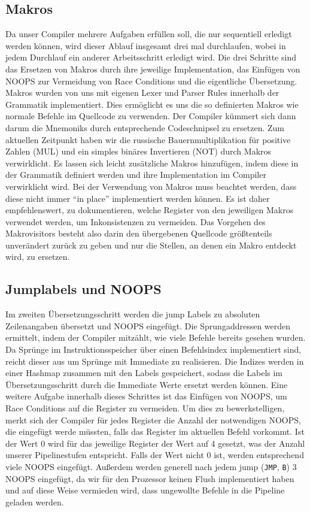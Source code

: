 \documentclass[paper=a4,fontsize=12pt]{scrreprt}
\begin{document}
\subsection{Makros}
Da unser Compiler mehrere Aufgaben erfüllen soll, die nur sequentiell erledigt werden können, wird dieser Ablauf insgesamt drei mal durchlaufen, wobei in jedem Durchlauf ein anderer Arbeitsschritt erledigt wird. Die drei Schritte sind das Ersetzen von Makros durch ihre jeweilige Implementation, das Einfügen von NOOPS zur Vermeidung von Race Conditions und die eigentliche Übersetzung.
Makros wurden von uns mit eigenen Lexer und Parser Rules innerhalb der Grammatik implementiert. Dies ermöglicht es uns die so definierten Makros wie normale Befehle im Quellcode zu verwenden. Der Compiler kümmert sich dann darum die Mnemoniks durch entsprechende Codeschnipsel zu ersetzen. Zum aktuellen Zeitpunkt haben wir die russische Bauernmultiplikation für positive Zahlen (MUL) und ein simples binäres Invertieren (NOT) durch Makros verwirklicht. Es lassen sich leicht zusätzliche Makros hinzufügen, indem diese in der Grammatik definiert werden und ihre Implementation im Compiler verwirklicht wird. Bei der Verwendung von Makros muss beachtet werden, dass diese nicht immer \enquote{in place} implementiert werden können. Es ist daher empfehlenswert, zu dokumentieren, welche Register von den jeweiligen Makros verwendet werden, um Inkonsistenzen zu vermeiden.
Das Vorgehen des Makrovisitors besteht also darin den übergebenen Quellcode größtenteils unverändert zurück zu geben und nur die Stellen, an denen ein Makro entdeckt wird, zu ersetzen.

\subsection{Jumplabels und NOOPS}
Im zweiten Übersetzungsschritt werden die jump Labels zu absoluten Zeilenangaben übersetzt und NOOPS eingefügt. Die Sprungaddressen werden ermittelt, indem der Compiler mitzählt, wie viele Befehle bereits gesehen wurden. Da Sprünge im Instruktionsspeicher über einen Befehlsindex implementiert sind, reicht dieser aus um Sprünge mit Immediate zu realisieren. Die Indizes werden in einer Hashmap zusammen mit den Labels gespeichert, sodass die Labels im Übersetzungsschritt durch die Immediate Werte ersetzt werden können.
Eine weitere Aufgabe innerhalb dieses Schrittes ist das Einfügen von NOOPS, um Race Conditions auf die Register zu vermeiden. Um dies zu bewerkstelligen, merkt sich der Compiler für jedes Register die Anzahl der notwendigen NOOPS, die eingefügt werde müssten, falls das Register im aktuellen Befehl vorkommt. Ist der Wert 0 wird für das jeweilige Register der Wert auf 4 gesetzt, was der Anzahl unserer Pipelinestufen entspricht. Falls der Wert nicht 0 ist, werden entsprechend viele NOOPS eingefügt. Außerdem werden generell nach jedem jump (\texttt{JMP}, \texttt{B}) 3 NOOPS eingefügt, da wir für den Prozessor keinen Flush implementiert haben und auf diese Weise vermieden wird, dass ungewollte Befehle in die Pipeline geladen werden.
\end{document}
